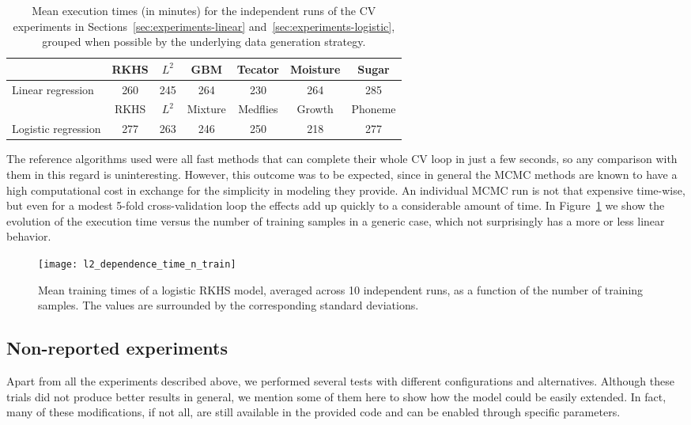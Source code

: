 \begin{table}[ht!]
  \centering
  \begin{tabular}{lcccccc}
\toprule
  &            RKHS &           \(L^2\) &           GBM &        Tecator & Moisture & Sugar \\
\midrule
Linear regression & 260 & 245 & 264 & 230 & 264 & 285\\
\bottomrule

  &            RKHS &           \(L^2\) &           Mixture &        Medflies & Growth & Phoneme \\
\toprule
Logistic regression & 277 & 263 & 246 & 250 & 218 & 277\\
\bottomrule
\end{tabular}
  \caption{Mean execution times (in minutes) for the independent runs of the CV experiments in Sections~\ref{sec:experiments-linear} and~\ref{sec:experiments-logistic}, grouped when possible by the underlying data generation strategy.}
\end{table}

The reference algorithms used were all fast methods that can complete their whole CV loop in just a few seconds, so any comparison with them in this regard is uninteresting. However, this outcome was to be expected, since in general the MCMC methods are known to have a high computational cost in exchange for the simplicity in modeling they provide. An individual MCMC run is not that expensive time-wise, but even for a modest 5-fold cross-validation loop the effects add up quickly to a considerable amount of time. In Figure~\ref{fig:dependence_time_n_train} we show the evolution of the execution time versus the number of training samples in a generic case, which not surprisingly has a more or less linear behavior.

\begin{figure}[ht!]
  \centering
  \texttt{[image: l2\_dependence\_time\_n\_train]}
  \caption{Mean training times of a logistic RKHS model, averaged across 10 independent runs, as a function of the number of training samples. The values are surrounded by the corresponding standard deviations. }\label{fig:dependence_time_n_train}
\end{figure}

\subsection*{Non-reported experiments}

Apart from all the experiments described above, we performed several tests with different configurations and alternatives. Although these trials did not produce better results in general, we mention some of them here to show how the model could be easily extended. In fact, many of these modifications, if not all, are still available in the provided code and can be enabled through specific parameters.

